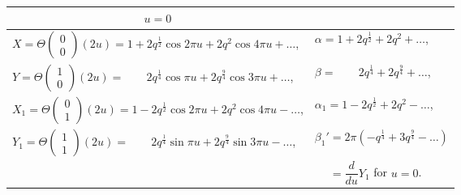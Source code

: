 \documentclass[11pt,a4paper]{book}
\begin{document}
\begin{center}
\small
\begin{tabular}{l|l}
\multicolumn{1}{c|}{$u = 0$} & \\
\hline
$X = \Theta\begin{pmatrix} 0 \\ 0 \end{pmatrix}(2u) = 1 + 2q^{\frac{1}{2}}\cos 2\pi u + 2q^2\cos 4\pi u + \dots$, & $\alpha = 1 + 2q^{\frac{1}{2}} + 2q^2 + \dots$, \\
$Y = \Theta\begin{pmatrix} 1 \\ 0 \end{pmatrix}(2u) = \phantom{1 +}\ 2q^{\frac{1}{4}}\cos\pi u + 2q^{\frac{9}{4}}\cos 3\pi u + \dots$, & $\beta = \phantom{1 +}\ 2q^{\frac{1}{4}} + 2q^{\frac{9}{4}} + \dots$, \\
$X_1 = \Theta\begin{pmatrix} 0 \\ 1 \end{pmatrix}(2u) = 1 - 2q^{\frac{1}{2}}\cos 2\pi u + 2q^2\cos 4\pi u - \dots$, & $\alpha_1 = 1 - 2q^{\frac{1}{2}} + 2q^2 - \dots$, \\
$Y_1 = \Theta\begin{pmatrix} 1 \\ 1 \end{pmatrix}(2u) = \phantom{1 +}\ 2q^{\frac{1}{4}}\sin\pi u + 2q^{\frac{9}{4}}\sin 3\pi u - \dots$, & $\beta_1' = 2\pi(-q^{\frac{1}{4}} + 3q^{\frac{9}{4}} - \dots)$ \\
 & $\phantom{\beta_1'} = \dfrac{d}{du}Y_1$ for $u = 0$.
\end{tabular}
\end{center}
\end{document}
